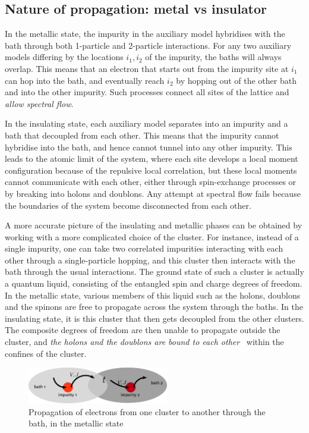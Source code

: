 \documentclass[reprint,hidelinks]{revtex4-2}
\begin{document}
\begin{widetext}
\section{Nature of propagation: metal vs insulator}
In the metallic state, the impurity in the auxiliary model hybridises with the bath through both 1-particle and 2-particle interactions. For any two auxiliary models differing by the locations \(i_1, i_2\) of the impurity, the baths will always overlap. This means that an electron that starts out from the impurity site at \(i_1\) can hop into the bath, and eventually reach \(i_2\) by hopping out of the other bath and into the other impurity. Such processes connect all sites of the lattice and \textit{allow spectral flow}.

In the insulating state, each auxiliary model separates into an impurity and a bath that decoupled from each other. This means that the impurity cannot hybridise into the bath, and hence cannot tunnel into any other impurity. This leads to the atomic limit of the system, where each site develops a local moment configuration because of the repulsive local correlation, but these local moments cannot communicate with each other, either through spin-exchange processes or by breaking into holons and doublons. Any attempt at spectral flow fails because the boundaries of the system become disconnected from each other.

A more accurate picture of the insulating and metallic phases can be obtained by working with a more complicated choice of the cluster. For instance, instead of a single impurity, one can take two correlated impurities interacting with each other through a single-particle hopping, and this cluster then interacts with the bath through the usual interactions. The ground state of such a cluster is actually a quantum liquid, consisting of the entangled spin and charge degrees of freedom. In the metallic state, various members of this liquid such as the holons, doublons and the spinons are free to propagate across the system through the baths. In the insulating state, it is this cluster that then gets decoupled from the other clusters. The composite degrees of freedom are then unable to propagate outside the cluster, and \textit{the holons and the doublons are bound to each other}~\cite{Mott_1949} within the confines of the cluster.

\begin{figure}[ht]
	\centering
	\includegraphics[width=0.55\textwidth]{metal_prop.pdf}
	\caption{Propagation of electrons from one cluster to another through the bath, in the metallic state}
\end{figure}


\end{widetext}
\end{document}
